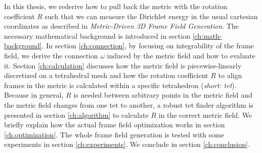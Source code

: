 \documentclass[../thesis.tex]{subfiles}
\begin{document}
In this thesis, we rederive how to pull back the metric with the rotation coefficient $R$ such that we can measure
the Dirichlet energy in the usual cartesian coordinates as described in \emph{Metric-Driven 3D Frame Field Generation}\cite{Fang23}.
The necessary mathematical background is introduced in section \ref{ch:math-background}.
In section \ref{ch:connection}, by focusing on integrability of the frame field,
we derive the connection $\omega$ induced by the metric field and how to evaluate it.
Section \ref{ch:calculation} discusses how the metric field is piecewise-linearly discretized on a tetrahedral
mesh and how the rotation coefficient $R$ to align frames in the metric is calculated within a specific tetrahedron (\emph{short: tet}).
Because in general, $R$ is needed between arbitrary points in the metric field and the metric field
changes from one tet to another, a robust tet finder algorithm is
presented in section \ref{ch:algorithm} to calculate $R$ in the correct metric field.
We briefly explain how the actual frame field optimization works in section \ref{ch:optimization}.
The whole frame field generation is tested with some experiments in section \ref{ch:experiments}.
We conclude in section \ref{ch:conclusion}.
\end{document}
